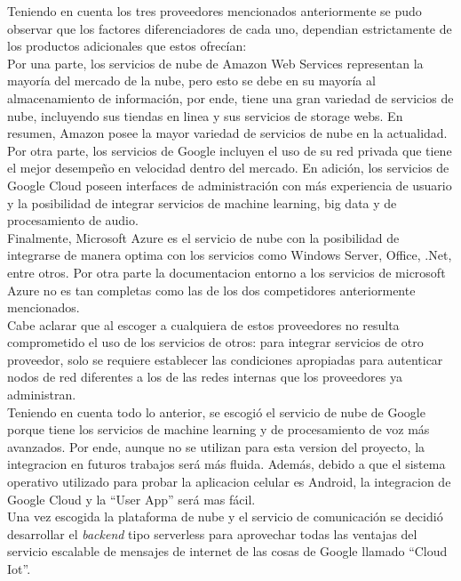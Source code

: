 Teniendo en cuenta los tres proveedores mencionados anteriormente se pudo observar que los factores diferenciadores de cada uno, dependian estrictamente de los productos adicionales que estos ofrecían:
\vspace{0.5cm}\\
Por una parte, los servicios de nube de Amazon Web Services representan la mayoría del mercado de la nube, pero esto se debe en su mayoría al almacenamiento de información, por ende, tiene una gran variedad de servicios de nube, incluyendo sus tiendas en linea y sus servicios de storage webs. En resumen, Amazon posee la mayor variedad de servicios de nube en la actualidad.
\vspace{0.5cm}\\
Por otra parte, los servicios de Google incluyen el uso de su red privada que tiene el mejor desempeño en velocidad dentro del mercado. En adición, los servicios de Google Cloud poseen interfaces de administración con más experiencia de usuario y la posibilidad de integrar servicios de machine learning, big data y de procesamiento de audio.
\vspace{0.5cm}\\
Finalmente, Microsoft Azure es el servicio de nube con la posibilidad de integrarse de manera optima con los servicios como  Windows Server, Office, .Net, entre otros. Por otra parte la documentacion entorno a los servicios de microsoft Azure no es tan completas como las de los dos competidores anteriormente mencionados.
\vspace{0.5cm}\\
Cabe aclarar que al escoger a cualquiera de estos proveedores no resulta comprometido el uso de los servicios de otros: para integrar servicios de otro proveedor, solo se requiere establecer las condiciones apropiadas para autenticar nodos de red diferentes a los de las redes internas que los proveedores ya administran.
\vspace{0.5cm}\\
Teniendo en cuenta todo lo anterior, se escogió el servicio de nube de Google porque tiene los servicios de machine learning y de procesamiento de voz más avanzados. Por ende, aunque no se utilizan para esta version del proyecto, la integracion en futuros trabajos será más fluida. Además, debido a que el sistema operativo utilizado para probar la aplicacion celular es Android, la integracion de Google Cloud  y la ``User App'' será mas fácil.
\vspace{0.5cm}\\
Una vez escogida la plataforma de nube y el servicio de comunicación se decidió desarrollar el \textit{backend} tipo serverless para aprovechar todas las ventajas del servicio escalable de mensajes de internet de las cosas de Google llamado ``Cloud Iot''.

